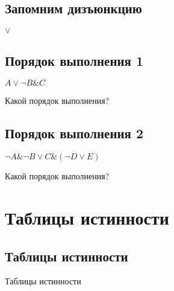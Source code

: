 \documentclass[compress,red]{beamer}
\begin{document}
\subsection{Запомним дизъюнкцию}
\begin{frame}
  \begin{center}
    \Huge{$\vee$}
  \end{center}
\end{frame}

\subsection{Порядок выполнения 1}
\begin{frame}
  \begin{center}
    \Huge{$A \vee {\neg} B \& C$}
  \end{center}
  \begin{center}
    \Large{Какой порядок выполнения?}
  \end{center}
\end{frame}

\subsection{Порядок выполнения 2}
\begin{frame}
  \begin{center}
    \Huge{${\neg} A \& {\neg} B \vee C \& ({\neg} D \vee E)$}
  \end{center}
  \begin{center}
    \Large{Какой порядок выполнения?}
  \end{center}
\end{frame}

\section{Таблицы истинности}
\subsection{Таблицы истинности}
\begin{frame}
  \begin{center}
    \Huge{Таблицы истинности}
  \end{center}
\end{frame}
\end{document}
